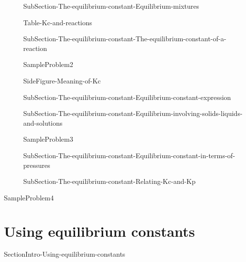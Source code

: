 \documentclass[main.tex]{subfiles}
\begin{document}
\sloppy\begin{description}



\item[] {SubSection-The-equilibrium-constant-Equilibrium-mixtures}



 {Table-Kc-and-reactions}

\item[] {SubSection-The-equilibrium-constant-The-equilibrium-constant-of-a-reaction}



  {SampleProblem2}

{SideFigure-Meaning-of-Kc}






\item[] {SubSection-The-equilibrium-constant-Equilibrium-constant-expression}




\item[] {SubSection-The-equilibrium-constant-Equilibrium-involving-solids-liquids-and-solutions}


  {SampleProblem3}


\item[] {SubSection-The-equilibrium-constant-Equilibrium-constant-in-terms-of-pressures}



\item[] {SubSection-The-equilibrium-constant-Relating-Kc-and-Kp}



\end{description}
  {SampleProblem4}











\section{ {Using equilibrium constants}}   {SectionIntro-Using-equilibrium-constants}
\end{document}

